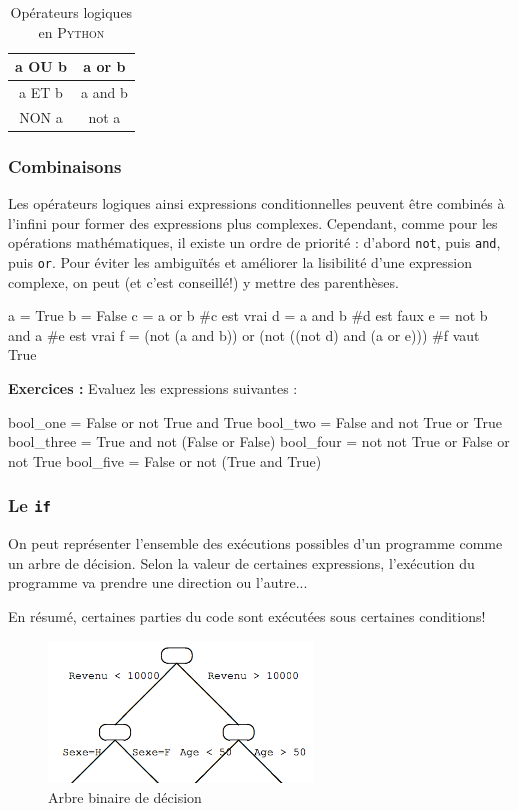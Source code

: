 \begin{table}[!h]
    \centering
    \begin{tabular}{|c|c|}
        \hline
        a OU b & a or b\\
        \hline
        a ET b & a and b \\
        \hline
        NON a & not a \\
        \hline
    \end{tabular}
    \caption{Opérateurs logiques en \textsc{Python}}
\end{table}

\subsubsection{Combinaisons}
Les opérateurs logiques ainsi expressions conditionnelles peuvent être combinés à l'infini pour former des expressions plus complexes. Cependant, comme pour les opérations mathématiques, il existe un ordre de priorité : d'abord \texttt{not}, puis \texttt{and}, puis \texttt{or}. Pour éviter les ambiguïtés et améliorer la lisibilité d'une expression complexe, on peut (et c'est conseillé!) y mettre des parenthèses.

\begin{python}[caption = Expressions booléennes]
a = True
b = False
c = a or b #c est vrai
d = a and b #d est faux
e = not b and a #e est vrai
f = (not (a and b)) or (not ((not d) and (a or e))) #f vaut True
\end{python}
\textbf{Exercices : } Evaluez les expressions suivantes :
\begin{python}[caption = Exercices d'expressions booléennes]
bool_one = False or not True and True
bool_two = False and not True or True
bool_three = True and not (False or False)
bool_four = not not True or False or not True
bool_five = False or not (True and True)
\end{python}
\subsubsection{Le \texttt{if}}
On peut représenter l'ensemble des exécutions possibles d'un programme comme un arbre de décision. Selon la valeur de certaines expressions, l'exécution du programme va prendre une direction ou
l'autre...


En résumé, certaines parties du code sont exécutées sous
certaines conditions!

\begin{figure}[!h]
    \centering
    \includegraphics[width=7cm]{img/arbre.png}
    \caption{Arbre binaire de décision}
    \label{arbre}
\end{figure}

